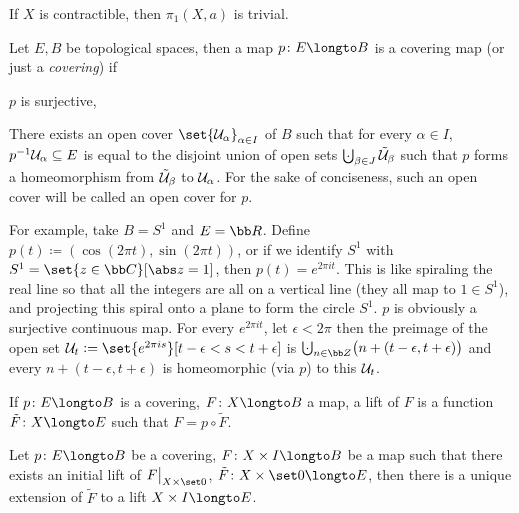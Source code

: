 \bcoro

    If $X$ is contractible, then $\pi_1(X,a)$ is trivial.

\ecoro

\bdefn

    Let $E,B$ be topological spaces, then a map $p\colon E\longto B$ is a {\emphcolor covering map} (or just a {\it covering}) if
    \benum
        \item $p$ is surjective,
        \item There exists an open cover $\set{\U_\alpha}_{\alpha\in I}$ of $B$ such that for every $\alpha\in I$, $p^{-1}{\cal U}_\alpha\subseteq E$ is equal to the disjoint union of open sets
        $\bigdcup_{\beta\in J}\tilde\U_\beta$ such that $p$ forms a homeomorphism from $\tilde{{\cal U}}_\beta$ to ${\cal U}_\alpha$.
        For the sake of conciseness, such an open cover will be called an {\emphcolor open cover for $p$}.
    \eenum

\edefn

For example, take $B=S^1$ and $E={\bb R}$.
Define $p(t)\coloneqq(\cos(2\pi t),\sin(2\pi t))$, or if we identify $S^1$ with $S^1=\set{z\in{\bb C}}[\abs z=1]$, then $p(t)=e^{2\pi it}$.
This is like spiraling the real line so that all the integers are all on a vertical line (they all map to $1\in S^1$), and projecting this spiral onto a plane to form the circle $S^1$.
$p$ is obviously a surjective continuous map.
For every $e^{2\pi it}$, let $\epsilon<2\pi$ then the preimage of the open set ${\cal U}_t\coloneqq\set{e^{2\pi is}}[t-\epsilon<s<t+\epsilon]$ is
$\bigdcup_{n\in{\bb Z}}\bigl(n+(t-\epsilon,t+\epsilon)\bigr)$ and every $n+(t-\epsilon,t+\epsilon)$ is homeomorphic (via $p$) to this ${\cal U}_t$.

\bdefn

    If $p\colon E\longto B$ is a covering, $F\colon X\longto B$ a map, a {\emphcolor lift} of $F$ is a function $\tilde F\colon X\longto E$ such that $F=p\circ\tilde F$.

\edefn

\blemm

    Let $p\colon E\longto B$ be a covering, $F\colon X\times I\longto B$ be a map such that there exists an initial lift of $F\bigl|_{X\times\set0}$, $\tilde F\colon X\times\set0\longto E$, then there is a
    unique extension of $\tilde F$ to a lift $X\times I\longto E$.

\elemm

